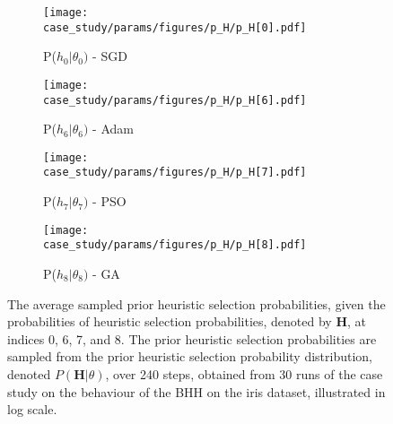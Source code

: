 \begin{figure}[htb]
      \begin{subfigure}{0.5\textwidth}
            \centering
            \texttt{[image: case\_study/params/figures/p\_H/p\_H[0].pdf]}
            \caption{P($h_{0} \vert \theta_{0})$ - \acs{SGD}}
            \label{fig:results:case_study:p_H:0}
      \end{subfigure}
      \begin{subfigure}{0.5\textwidth}
            \centering
            \texttt{[image: case\_study/params/figures/p\_H/p\_H[6].pdf]}
            \caption{P($h_{6} \vert \theta_{6})$ - \acs{Adam}}
            \label{fig:results:case_study:p_H:6}
      \end{subfigure}
      \par\bigskip
      \begin{subfigure}{0.5\textwidth}
            \centering
            \texttt{[image: case\_study/params/figures/p\_H/p\_H[7].pdf]}
            \caption{P($h_{7} \vert \theta_{7})$ - \acs{PSO}}
            \label{fig:results:case_study:p_H:7}
      \end{subfigure}
      \begin{subfigure}{0.5\textwidth}
            \centering
            \texttt{[image: case\_study/params/figures/p\_H/p\_H[8].pdf]}
            \caption{P($h_{8} \vert \theta_{8})$ - \acs{GA}}
            \label{fig:results:case_study:p_H:8}
      \end{subfigure}
      \par\bigskip
      \caption{The average sampled prior heuristic selection probabilities, given the probabilities of heuristic selection probabilities, denoted by $\boldsymbol{H}$, at indices 0, 6, 7, and 8. The prior heuristic selection probabilities are sampled from the prior heuristic selection probability distribution, denoted $P(\boldsymbol{H} \vert \theta)$, over 240 steps, obtained from 30 runs of the case study on the behaviour of the \acs{BHH} on the iris dataset, illustrated in log scale.}
      \label{fig:results:case_study:p_H}
\end{figure}

